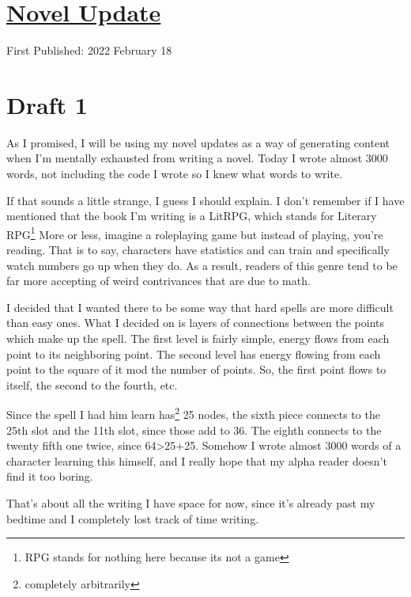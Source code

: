 \documentclass[12pt]{article}[titlepage]
\newcommand{\1}{\={a}}
\newcommand{\2}{\={e}}
\newcommand{\3}{\={\i}}
\newcommand{\4}{\=o}
\newcommand{\5}{\=u}
\newcommand{\6}{\={A}}
\renewcommand{\,}{\textsuperscript{,}}
\begin{document}
\doublespacing
\section{\href{novel-update-2.html}{Novel Update}}
First Published: 2022 February 18

\section{Draft 1}
As I promised, I will be using my novel updates as a way of generating content when I'm mentally exhausted from writing a novel.
Today I wrote almost 3000 words, not including the code I wrote so I knew what words to write.

If that sounds a little strange, I guess I should explain.
I don't remember if I have mentioned that the book I'm writing is a LitRPG, which stands for Literary RPG\footnote{RPG stands for nothing here because its not a game}
More or less, imagine a roleplaying game but instead of playing, you're reading.
That is to say, characters have statistics and can train and specifically watch numbers go up when they do.
As a result, readers of this genre tend to be far more accepting of weird contrivances that are due to math.

I decided that I wanted there to be some way that hard spells are more difficult than easy ones.
What I decided on is layers of connections between the points which make up the spell.
The first level is fairly simple, energy flows from each point to its neighboring point.
The second level has energy flowing from each point to the square of it mod the number of points.
So, the first point flows to itself, the second to the fourth, etc.

Since the spell I had him learn has\footnote{completely arbitrarily} 25 nodes, the sixth piece connects to the 25th slot and the 11th slot, since those add to 36.
The eighth connects to the twenty fifth one twice, since 64>25+25.
Somehow I wrote almost 3000 words of a character learning this himself, and I really hope that my alpha reader doesn't find it too boring.

That's about all the writing I have space for now, since it's already past my bedtime and I completely lost track of time writing.
\end{document}
